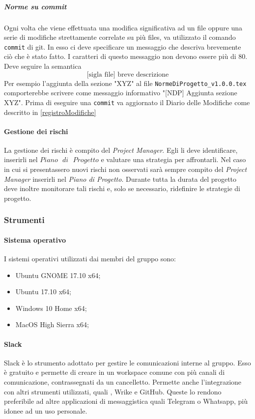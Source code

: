 \subparagraph{Norme su commit}\Spazio
Ogni volta che viene effettuata una modifica significativa ad un file oppure una serie di modifiche strettamente correlate su più files, va utilizzato il comando \texttt{commit} di git. In esso ci deve specificare un messaggio che descriva brevemente ciò che è stato fatto. I caratteri di questo messaggio non devono essere più di 80. Deve seguire la semantica
$$\text{[sigla file] breve descrizione}$$
Per esempio l'aggiunta della sezione "XYZ" al file \texttt{NormeDiProgetto\_v1.0.0.tex} comporterebbe scrivere come messaggio informativo "[NDP] Aggiunta sezione XYZ". Prima di eseguire una \texttt{commit} va aggiornato il Diario delle Modifiche come descritto in \ref{registroModifiche}

\paragraph{Gestione dei rischi} \Spazio
La gestione dei rischi è compito del \emph{Project Manager}. Egli li deve identificare, inserirli nel $Piano\text{ }di\text{ }Progetto$ e valutare una strategia per affrontarli. Nel caso in cui si presentassero nuovi rischi non osservati sarà sempre compito del \emph{Project Manager} inserirli nel \emph{Piano di Progetto}. Durante tutta la durata del progetto deve inoltre monitorare tali rischi e, solo se necessario, ridefinire le strategie di progetto.

\subsubsection{Strumenti}

\paragraph{Sistema operativo} \Spazio
I sistemi operativi utilizzati dai membri del gruppo sono:
\begin{itemize}
	\item Ubuntu GNOME 17.10 x64;
	\item Ubuntu 17.10 x64;
	\item Windows 10 Home x64;
	\item MacOS High Sierra x64;
\end{itemize}

\paragraph{Slack}\Spazio
Slack è lo strumento adottato per gestire le comunicazioni interne al gruppo. Esso è gratuito e permette di creare in un workspace comune con più canali di comunicazione, contrassegnati da un cancelletto. Permette anche l'integrazione con altri strumenti utilizzati, quali , Wrike e GitHub. Queste  lo rendono preferibile ad altre applicazioni di messaggistica quali Telegram o Whatsapp, più idonee ad un uso personale.

